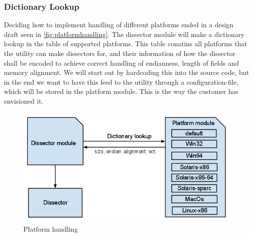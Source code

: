 \subsubsection{Dictionary Lookup}
Deciding how to implement handling of different platforms ended in a design draft seen in \autoref{fig:platformhandling}. The \gls{dissector} module will make a dictionary lookup in the table of supported platforms. This table conatins all platforms that the \gls{utility} can make \glspl{dissector} for, and their information of how the \gls{dissector} shall be encoded to achieve correct handling of \gls{endianness}, length of fields and memory alignment.
We will start out by hardcoding this into the source code, but in the end we want to have this feed to the \gls{utility} through a configuration-file, which will be stored in the platform module. This is the way the customer has envisioned it.  

\begin{figure}[!htb]
	\includegraphics[width=\textwidth]{./sprints/img/platformhandling}
	\caption{Platform handling\label{fig:platformhandling}}
\end{figure}

